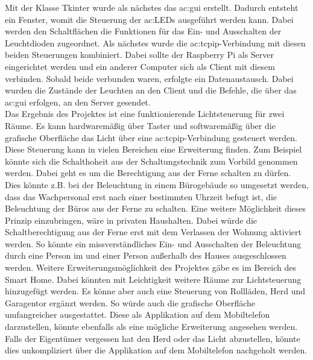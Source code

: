 Mit der Klasse Tkinter wurde als nächstes das \gls{ac:gui}  erstellt. Dadurch entsteht ein Fenster, womit die Steuerung der \gls{ac:LED}s ausgeführt werden kann. Dabei werden den Schaltflächen die Funktionen für das Ein- und Ausschalten der Leuchtdioden zugeordnet.
Als nächstes wurde die \gls{ac:tcpip}-Verbindung mit diesen beiden Steuerungen kombiniert. Dabei sollte der Raspberry Pi als Server eingerichtet werden und ein anderer Computer sich als Client mit diesem verbinden. Sobald beide verbunden waren, erfolgte ein Datenaustausch. Dabei wurden die Zustände der Leuchten an den Client und die Befehle, die über das \gls{ac:gui} erfolgen, an den Server gesendet. \\[0.2cm]
Das Ergebnis des Projektes ist eine funktionierende Lichtsteuerung für zwei Räume. Es kann hardwaremäßig über Taster und softwaremäßig über die grafische Oberfläche das Licht über eine \gls{ac:tcpip}-Verbindung gesteuert werden.\\[0.2cm]
Diese Steuerung kann in vielen Bereichen eine Erweiterung finden. Zum Beispiel könnte sich die Schalthoheit aus der Schaltungstechnik zum Vorbild genommen werden. Dabei geht es um die Berechtigung aus der Ferne schalten zu dürfen. Dies könnte z.B. bei der Beleuchtung in einem Bürogebäude so umgesetzt werden, dass das Wachpersonal erst nach einer bestimmten Uhrzeit befugt ist, die Beleuchtung der Büros aus der Ferne zu schalten. Eine weitere Möglichkeit dieses Prinzip einzubringen, wäre in privaten Haushalten. Dabei würde die Schaltberechtigung aus der Ferne erst mit dem Verlassen der Wohnung aktiviert werden. So könnte ein missverständliches Ein- und Ausschalten der Beleuchtung durch eine Person im und einer Person außerhalb des Hauses ausgeschlossen werden. Weitere Erweiterungsmöglichkeit des Projektes gäbe es im Bereich des Smart Home. Dabei könnten mit Leichtigkeit weitere Räume zur Lichtsteuerung hinzugefügt werden. Es könne aber auch eine Steuerung von Rollläden, Herd und Garagentor ergänzt werden. So würde auch die grafische Oberfläche umfangreicher ausgestattet. Diese als Applikation auf dem Mobiltelefon darzustellen, könnte ebenfalls als eine mögliche Erweiterung angesehen werden. Falls der Eigentümer vergessen hat den Herd oder das Licht abzustellen, könnte dies unkompliziert über die Applikation auf dem Mobiltelefon nachgeholt werden. 




\listoffigures %
\newpage
\listoftables %
\newpage
\lstlistoflistings %
\newpage
\printbibliography %

